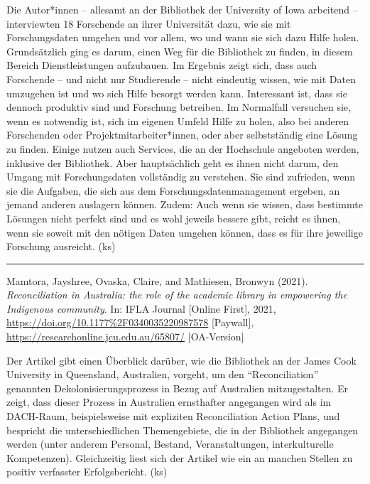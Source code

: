 \documentclass[a4paper,
fontsize=11pt,
oneside,
numbers=noperiodatend,
parskip=half-,
bibliography=totoc,
final
]{scrartcl}
\begin{document}
Die Autor*innen -- allesamt an der Bibliothek der University of Iowa
arbeitend -- interviewten 18 Forschende an ihrer Universität dazu, wie
sie mit Forschungsdaten umgehen und vor allem, wo und wann sie sich dazu
Hilfe holen. Grundsätzlich ging es darum, einen Weg für die Bibliothek
zu finden, in diesem Bereich Dienstleistungen aufzubauen. Im Ergebnis
zeigt sich, dass auch Forschende -- und nicht nur Studierende -- nicht
eindeutig wissen, wie mit Daten umzugehen ist und wo sich Hilfe besorgt
werden kann. Interessant ist, dass sie dennoch produktiv sind und
Forschung betreiben. Im Normalfall versuchen sie, wenn es notwendig ist,
sich im eigenen Umfeld Hilfe zu holen, also bei anderen Forschenden oder
Projektmitarbeiter*innen, oder aber selbstständig eine Lösung zu finden.
Einige nutzen auch Services, die an der Hochschule angeboten werden,
inklusive der Bibliothek. Aber hauptsächlich geht es ihnen nicht darum,
den Umgang mit Forschungsdaten vollständig zu verstehen. Sie sind
zufrieden, wenn sie die Aufgaben, die sich aus dem
Forschungsdatenmanagement ergeben, an jemand anderen auslagern können.
Zudem: Auch wenn sie wissen, dass bestimmte Lösungen nicht perfekt sind
und es wohl jeweils bessere gibt, reicht es ihnen, wenn sie soweit mit
den nötigen Daten umgehen können, dass es für ihre jeweilige Forschung
ausreicht. (ks)

\begin{center}\rule{0.5\linewidth}{0.5pt}\end{center}

Mamtora, Jayshree, Ovaska, Claire, and Mathiesen, Bronwyn (2021).
\emph{Reconciliation in Australia: the role of the academic library in
empowering the Indigenous community}. In: IFLA Journal {[}Online
First{]}, 2021, \url{https://doi.org/10.1177\%2F0340035220987578}
{[}Paywall{]}, \url{https://researchonline.jcu.edu.au/65807/}
{[}OA-Version{]}

Der Artikel gibt einen Überblick darüber, wie die Bibliothek an der
James Cook University in Queensland, Australien, vorgeht, um den
\enquote{Reconciliation} genannten Dekolonisierungsprozess in Bezug auf
Australien mitzugestalten. Er zeigt, dass dieser Prozess in Australien
ernsthafter angegangen wird als im DACH-Raum, beispielsweise mit
expliziten Reconciliation Action Plans, und bespricht die
unterschiedlichen Themengebiete, die in der Bibliothek angegangen werden
(unter anderem Personal, Bestand, Veranstaltungen, interkulturelle
Kompetenzen). Gleichzeitig liest sich der Artikel wie ein an manchen
Stellen zu positiv verfasster Erfolgsbericht. (ks)
\end{document}

